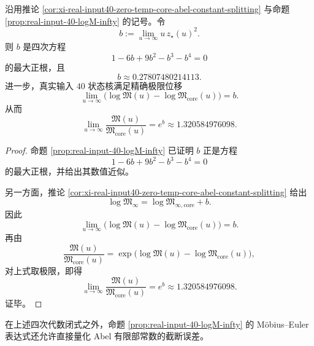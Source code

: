 \begin{theorem}\label{thm:xi-real-input40-zero-temp-abel-jump-quartic-locked}
沿用推论 \ref{cor:xi-real-input40-zero-temp-core-abel-constant-splitting} 与命题 \ref{prop:real-input-40-logM-infty} 的记号。令
\[
b:=\lim_{u\to\infty}u\,z_\star(u)^2.
\]
则 \(b\) 是四次方程
\[
1-6b+9b^2-b^3-b^4=0
\]
的最大正根，且
\[
b\approx 0.27807480214113.
\]
进一步，真实输入 \(40\) 状态核满足精确极限位移
\[
\boxed{\;
\lim_{u\to\infty}
\bigl(\log\mathfrak M(u)-\log\mathfrak M_{\mathrm{core}}(u)\bigr)
=
b.\;}
\]
从而
\[
\boxed{\;
\lim_{u\to\infty}
\frac{\mathfrak M(u)}{\mathfrak M_{\mathrm{core}}(u)}
=
e^{b}
\approx 1.320584976098.\;}
\]
\end{theorem}
\begin{proof}
命题 \ref{prop:real-input-40-logM-infty} 已证明 \(b\) 正是方程
\[
1-6b+9b^2-b^3-b^4=0
\]
的最大正根，并给出其数值近似。

另一方面，推论 \ref{cor:xi-real-input40-zero-temp-core-abel-constant-splitting} 给出
\[
\log\mathfrak M_\infty
=
\log\mathfrak M_{\infty,\mathrm{core}}+b.
\]
因此
\[
\lim_{u\to\infty}
\bigl(\log\mathfrak M(u)-\log\mathfrak M_{\mathrm{core}}(u)\bigr)
=
b.
\]
再由
\[
\frac{\mathfrak M(u)}{\mathfrak M_{\mathrm{core}}(u)}
=
\exp\!\bigl(\log\mathfrak M(u)-\log\mathfrak M_{\mathrm{core}}(u)\bigr),
\]
对上式取极限，即得
\[
\lim_{u\to\infty}
\frac{\mathfrak M(u)}{\mathfrak M_{\mathrm{core}}(u)}
=
e^b
\approx 1.320584976098.
\]
证毕。
\end{proof}

\noindent 在上述四次代数闭式之外，命题 \ref{prop:real-input-40-logM-infty} 的 Möbius--Euler 表达式还允许直接量化 Abel 有限部常数的截断误差。




